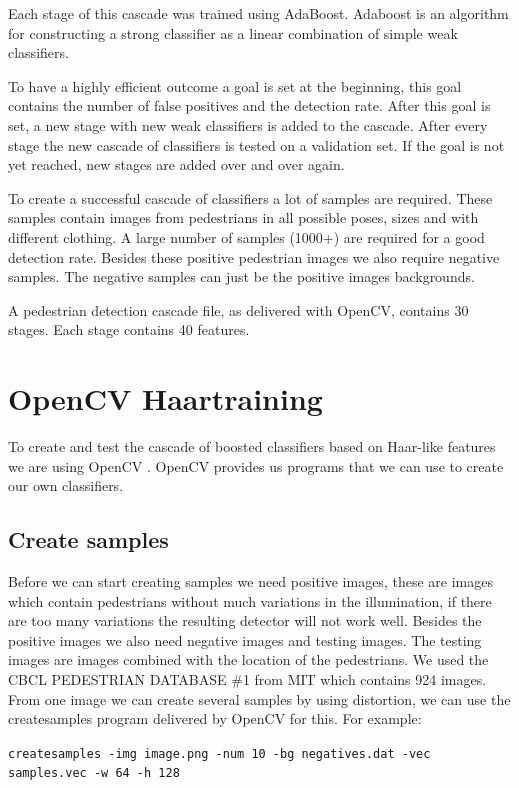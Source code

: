 \documentclass{article}
\begin{document}
Each stage of this cascade was trained using AdaBoost. Adaboost is an algorithm for constructing a strong classifier as a linear combination of simple weak classifiers.

To have a highly efficient outcome a goal is set at the beginning, this goal contains the number of false positives and the detection rate. After this goal is set, a new stage with new weak classifiers is added to the cascade. After every stage the new cascade of classifiers is tested on a validation set. If the goal is not yet reached, new stages are added over and over again.

To create a successful cascade of classifiers a lot of samples are required. These samples contain images from pedestrians in all possible poses, sizes and with different clothing. A large number of samples (1000+) are required for a good detection rate.  Besides these positive pedestrian images we also require negative samples. The negative samples can just be the positive images backgrounds.

A pedestrian detection cascade file, as delivered with OpenCV, contains 30 stages. Each stage contains 40 features. 





\section{OpenCV Haartraining}
To create and test the cascade of boosted classifiers based on Haar-like features we are using OpenCV \cite{opencv_library}. OpenCV provides us programs that we can use to create our own classifiers.

\subsection{Create samples}
Before we can start creating samples we need positive images, these are images which contain pedestrians without much variations in the illumination, if there are too many variations the resulting detector will not work well.
Besides the positive images we also need negative images and testing images. The testing images are images combined with the location of the pedestrians. We used the CBCL PEDESTRIAN DATABASE \#1 from MIT which contains 924 images.
From one image we can create several samples by using distortion, we can use the createsamples program delivered by OpenCV for this. For example:

\texttt{createsamples -img image.png -num 10 -bg negatives.dat -vec samples.vec -w 64 -h 128}
\end{document}
